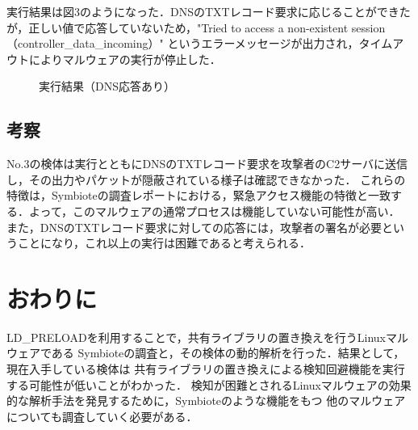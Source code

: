 \documentclass[submit,techreq,noauthor]{eco}	%
\begin{document}
  実行結果は図3のようになった．DNSのTXTレコード要求に応じることができたが，正しい値で応答していないため，"Tried to access a non-existent session（controller\_data\_incoming）"
  というエラーメッセージが出力され，タイムアウトによりマルウェアの実行が停止した．

  \begin{figure}[H]
    \centering
    \caption{実行結果（DNS応答あり）}
    \label{fig:003}
  \end{figure}

\subsection{考察}
No.3の検体は実行とともにDNSのTXTレコード要求を攻撃者のC2サーバに送信し，その出力やパケットが隠蔽されている様子は確認できなかった．
これらの特徴は，Symbioteの調査レポートにおける，緊急アクセス機能の特徴と一致する．よって，このマルウェアの通常プロセスは機能していない可能性が高い．
  また，DNSのTXTレコード要求に対しての応答には，攻撃者の署名が必要ということになり，これ以上の実行は困難であると考えられる．\\

\section{おわりに}
LD\_PRELOADを利用することで，共有ライブラリの置き換えを行うLinuxマルウェアである
Symbioteの調査と，その検体の動的解析を行った．結果として，現在入手している検体は
共有ライブラリの置き換えによる検知回避機能を実行する可能性が低いことがわかった．
検知が困難とされるLinuxマルウェアの効果的な解析手法を発見するために，Symbioteのような機能をもつ
他のマルウェアについても調査していく必要がある．

\setlength\baselineskip{12pt}
{\small
	
	
}
\end{document}

